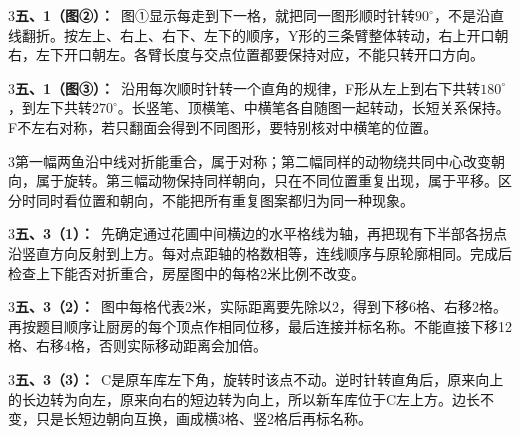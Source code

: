 \documentclass[multi=snippet,border={5bp 20bp 5bp 5bp}]{standalone}
\newenvironment{snippet}[3]{\begin{minipage}{#1bp}\color{answerred}\fontsize{#2}{#3}\selectfont\raggedright}{\end{minipage}}
\begin{document}
\begin{snippet}{505}{11.5}{14}\begin{multicols}{3}\raggedcolumns \textbf{五、1（图②）：}\ 图①显示每走到下一格，就把同一图形顺时针转\(90^\circ\)\allowbreak ，不是沿直线翻折。按左上、右上、右下、左下的顺序，Y形的三条臂整体转动，右上开口朝右，左下开口朝左。各臂长度与交点位置都要保持对应，不能只转开口方向。\end{multicols}\end{snippet}
\begin{snippet}{505}{11.5}{14}\begin{multicols}{3}\raggedcolumns \textbf{五、1（图③）：}\ 沿用每次顺时针转一个直角的规律，F形从左上到右下共转\(180^\circ\)\allowbreak ，到左下共转\(270^\circ\)\allowbreak 。长竖笔、顶横笔、中横笔各自随图一起转动，长短关系保持。F不左右对称，若只翻面会得到不同图形，要特别核对中横笔的位置。\end{multicols}\end{snippet}
\begin{snippet}{505}{11.5}{14}\begin{multicols}{3}\raggedcolumns 第一幅两鱼沿中线对折能重合，属于对称；第二幅同样的动物绕共同中心改变朝向，属于旋转。第三幅动物保持同样朝向，只在不同位置重复出现，属于平移。区分时同时看位置和朝向，不能把所有重复图案都归为同一种现象。\end{multicols}\end{snippet}
\begin{snippet}{505}{11.5}{14}\begin{multicols}{3}\raggedcolumns \textbf{五、3（1）：}\ 先确定通过花圃中间横边的水平格线为轴，再把现有下半部各拐点沿竖直方向反射到上方。每对点距轴的格数相等，连线顺序与原轮廓相同。完成后检查上下能否对折重合，房屋图中的每格2米比例不改变。\end{multicols}\end{snippet}
\begin{snippet}{505}{11.5}{14}\begin{multicols}{3}\raggedcolumns \textbf{五、3（2）：}\ 图中每格代表2米，实际距离要先除以2，得到下移6格、右移2格。再按题目顺序让厨房的每个顶点作相同位移，最后连接并标名称。不能直接下移12格、右移4格，否则实际移动距离会加倍。\end{multicols}\end{snippet}
\begin{snippet}{505}{11.5}{14}\begin{multicols}{3}\raggedcolumns \textbf{五、3（3）：}\ C是原车库左下角，旋转时该点不动。逆时针转直角后，原来向上的长边转为向左，原来向右的短边转为向上，所以新车库位于C左上方。边长不变，只是长短边朝向互换，画成横3格、竖2格后再标名称。\end{multicols}\end{snippet}
\end{document}
